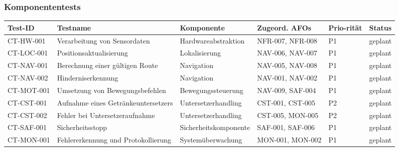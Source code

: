 \documentclass[
  a4paper,
  12pt,
  DIV=12,        %
  parskip=half,  %
  headings=small %
]{scrartcl}
\theoremstyle{definition}
\theoremstyle{definition}
\begin{document}
\begin{landscape}
\subsubsection{Komponententests}\label{komponententests-2}

\begin{longtable}[]{@{}
  >{\raggedright\arraybackslash}p{}
  >{\raggedright\arraybackslash}p{}
  >{\raggedright\arraybackslash}p{}
  >{\raggedright\arraybackslash}p{}
  >{\raggedright\arraybackslash}p{}
  >{\raggedright\arraybackslash}p{}@{}}
\toprule\noalign{}
\begin{minipage}[b]{\linewidth}\raggedright
Test-ID
\end{minipage} & \begin{minipage}[b]{\linewidth}\raggedright
Testname
\end{minipage} & \begin{minipage}[b]{\linewidth}\raggedright
Komponente
\end{minipage} & \begin{minipage}[b]{\linewidth}\raggedright
Zugeord. AFOs
\end{minipage} & \begin{minipage}[b]{\linewidth}\raggedright
Prio-rität
\end{minipage} & \begin{minipage}[b]{\linewidth}\raggedright
Status
\end{minipage} \\
\midrule\noalign{}
\endhead
\bottomrule\noalign{}
\endlastfoot
CT-HW-001 & Verarbeitung von Sensordaten & Hardwareabstraktion &
NFR-007, NFR-008 & P1 & geplant \\
CT-LOC-001 & Positionsaktualisierung & Lokalisierung & NAV-006, NAV-007
& P1 & geplant \\
CT-NAV-001 & Berechnung einer gültigen Route & Navigation & NAV-005,
NAV-008 & P1 & geplant \\
CT-NAV-002 & Hinderniserkennung & Navigation & NAV-001, NAV-002 & P1 &
geplant \\
CT-MOT-001 & Umsetzung von Bewegungsbefehlen & Bewegungssteuerung &
NAV-009, SAF-004 & P1 & geplant \\
CT-CST-001 & Aufnahme eines Getränkeuntersetzers & Untersetzerhandling
& CST-001, CST-005 & P2 & geplant \\
CT-CST-002 & Fehler bei Untersetzeraufnahme & Untersetzerhandling &
CST-005, MON-005 & P2 & geplant \\
CT-SAF-001 & Sicherheitsstopp & Sicherheitskomponente & SAF-001,
SAF-006 & P1 & geplant \\
CT-MON-001 & Fehlererkennung und Protokollierung & Systemüberwachung &
MON-001, MON-002 & P1 & geplant \\
\end{longtable}
\end{landscape}
\end{document}
